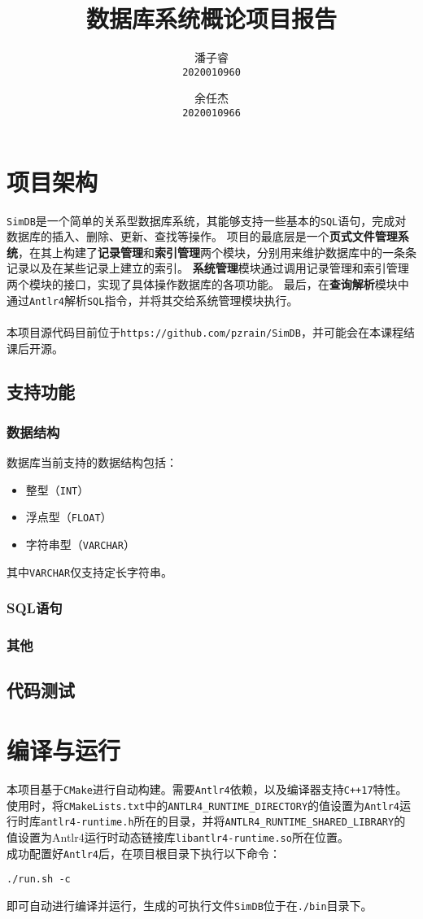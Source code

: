 \documentclass[11pt]{article}
\title{\textbf{数据库系统概论项目报告}}
\author{
    潘子睿\\
    \texttt{2020010960}
    \and
    余任杰\\
    \texttt{2020010966}
}
\begin{document}
\maketitle
\tableofcontents
\setlength{\parindent}{0pt}
\clearpage

\section{项目架构}
\texttt{SimDB}是一个简单的关系型数据库系统，其能够支持一些基本的\texttt{SQL}语句，完成对数据库的插入、删除、更新、查找等操作。
项目的最底层是一个\textbf{页式文件管理系统}，在其上构建了\textbf{记录管理}和\textbf{索引管理}两个模块，分别用来维护数据库中的一条条记录以及在某些记录上建立的索引。
\textbf{系统管理}模块通过调用记录管理和索引管理两个模块的接口，实现了具体操作数据库的各项功能。
最后，在\textbf{查询解析}模块中通过\texttt{Antlr4}解析\texttt{SQL}指令，并将其交给系统管理模块执行。\\\\
本项目源代码目前位于\texttt{https://github.com/pzrain/SimDB}，并可能会在本课程结课后开源。
\subsection{支持功能}
\subsubsection{数据结构}
数据库当前支持的数据结构包括：
\begin{itemize}
    \item 整型（\texttt{INT}）
    \item 浮点型（\texttt{FLOAT}）
    \item 字符串型（\texttt{VARCHAR}）
\end{itemize}
其中\texttt{VARCHAR}仅支持定长字符串。
\subsubsection{SQL语句}
\subsubsection{其他}
\subsection{代码测试}

\section{编译与运行}
本项目基于\texttt{CMake}进行自动构建。需要\texttt{Antlr4}依赖，以及编译器支持\texttt{C++17}特性。
使用时，将\texttt{CMakeLists.txt}中的\texttt{ANTLR4\_RUNTIME\_DIRECTORY}的值设置为\texttt{Antlr4}运行时库\texttt{antlr4-runtime.h}所在的目录，并将\texttt{ANTLR4\_RUNTIME\_SHARED\_LIBRARY}的值设置为Antlr4运行时动态链接库\texttt{libantlr4-runtime.so}所在位置。\\
成功配置好\texttt{Antlr4}后，在项目根目录下执行以下命令：
\begin{verbatim}
./run.sh -c
\end{verbatim}
即可自动进行编译并运行，生成的可执行文件\texttt{SimDB}位于在\texttt{./bin}目录下。
\end{document}
